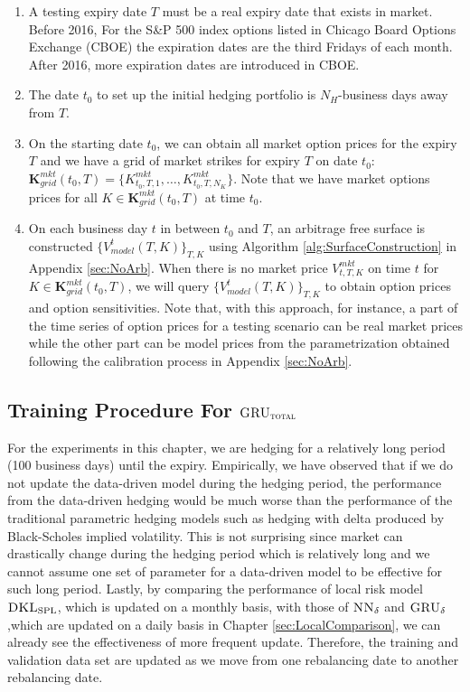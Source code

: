 \documentclass[letterpaper,12pt,titlepage,oneside,final]{book}
\numberwithin{equation}{section}
\theoremstyle{definition}
\newcommand{\model}{\textsc{GRU}_\delta}
\newcommand{\modelT}{\textsc{GRU}_{\textsc{total}}}
\newcommand{\modelN}{\textsc{NN}_\delta}
\newcommand{\DKLs}{\bf\textsc{DKL}_{\text{SPL}}}
\begin{document}
\begin{enumerate}
	\item A testing expiry date $T$ must be a real expiry date that exists in market. Before 2016, For the S\&P 500 index options listed in Chicago Board Options Exchange (CBOE) the expiration dates are the third Fridays of each month. After 2016, more expiration dates are introduced in CBOE.
	\item The date $t_0$ to set up the initial hedging portfolio is  $N_H$-business days away from $T$.
	\item On the starting date $t_0$, we can obtain all market option prices for the expiry  $T$ and we have a grid of market strikes for expiry $T$ on date $t_0$:
	$\mathbf{K}^{mkt}_{grid}(t _0,T)=\{	K^{mkt}_{t_0,T,1},\dots,K^{mkt}_{t_0,T,N_K}\}$. Note that we have market options  prices for all $K \in \mathbf{K}^{mkt}_{grid}(t _0,T)$ at time $t_0$.
	\item On each business day $t$ in between $t _0$ and $T$, an arbitrage free surface is constructed $\{V^{t}_{model}(T,K)\}_{T,K}$ using Algorithm \ref{alg:SurfaceConstruction} in Appendix \ref{sec:NoArb}. 
	When there is no  market price $V^{mkt}_{t,T,K}$ on time $t$ for $K \in \mathbf{K}^{mkt}_{grid}(t _0,T)$, we will query $\{V^{t}_{model}(T,K)\}_{T,K}$ to obtain  option prices and option sensitivities.  Note that, with this approach, for instance, a part  of the time series of option prices for a testing scenario can be real market prices while the other part can be model prices from the  parametrization  obtained following the calibration process in Appendix \ref{sec:NoArb}.
\end{enumerate}








\subsection{Training Procedure For $\modelT$}
\label{sec:TotalModelProcedure}
For the experiments in this chapter, we are hedging for a relatively long period (100 business days) until the expiry.  Empirically, we have observed that if we do not update the data-driven model during the hedging period, the performance from the data-driven hedging would be much worse than the performance of the traditional parametric hedging models such as hedging with delta produced by Black-Scholes implied volatility. This is not surprising since market can drastically change during the hedging period which is relatively long and we cannot assume one set of parameter for a data-driven model to be effective for such long period. Lastly, by comparing the performance of local risk model  $\DKLs$, which is updated on a monthly basis,  with those of $\modelN$ and $\model$ ,which are updated on a daily basis in Chapter \ref{sec:LocalComparison}, we can already see the effectiveness of more frequent update.  Therefore, the training and validation data set are updated as we move from one rebalancing date to another rebalancing date. 
\end{document}
